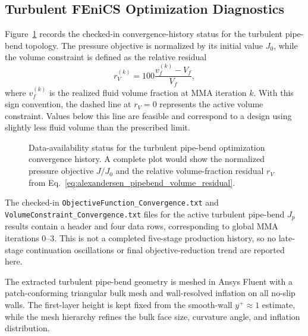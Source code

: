 \subsection{Turbulent FEniCS Optimization Diagnostics}
\label{subsec:app_B_alexandersen_pipebend_turb_diagnostics}
Figure~\ref{fig:alexandersen_pipebend_histories} records the checked-in convergence-history status for the turbulent pipe-bend topology. The pressure objective is normalized by its initial value $J_0$, while the volume constraint is defined as the relative residual
\begin{equation}
	r_V^{(k)} = 100 \frac{v_f^{(k)} - V_f}{V_f},
	\label{eq:alexandersen_pipebend_volume_residual}
\end{equation}
where $v_f^{(k)}$ is the realized fluid volume fraction at MMA iteration $k$. With this sign convention, the dashed line at $r_V=0$ represents the active volume constraint. Values below this line are feasible and correspond to a design using slightly less fluid volume than the prescribed limit.

\begin{figure}[htbp]
	\centering
	\caption{Data-availability status for the turbulent pipe-bend optimization convergence history. A complete plot would show the normalized pressure objective $J/J_0$ and the relative volume-fraction residual $r_V$ from Eq.~\eqref{eq:alexandersen_pipebend_volume_residual}.}
	\label{fig:alexandersen_pipebend_histories}
\end{figure}

The checked-in \texttt{ObjectiveFunction\_Convergence.txt} and \texttt{VolumeConstraint\_Convergence.txt} files for the active turbulent pipe-bend $J_p$ results contain a header and four data rows, corresponding to global MMA iterations $0$--$3$. This is not a completed five-stage production history, so no late-stage continuation oscillations or final objective-reduction trend are reported here.

\FloatBarrier

The extracted turbulent pipe-bend geometry is meshed in Ansys Fluent with a patch-conforming triangular bulk mesh and wall-resolved inflation on all no-slip walls. The first-layer height is kept fixed from the smooth-wall $y^+\approx1$ estimate, while the mesh hierarchy refines the bulk face size, curvature angle, and inflation distribution.

